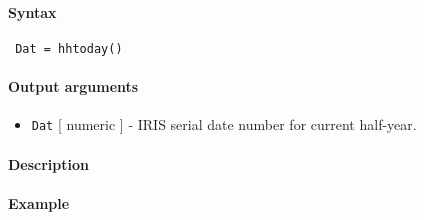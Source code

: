 


	\paragraph{Syntax}
 
 \begin{verbatim}
 Dat = hhtoday()
 \end{verbatim}
 
 \paragraph{Output arguments}
 
 \begin{itemize}
 \item
   \texttt{Dat} {[} numeric {]} - IRIS serial date number for current
   half-year.
 \end{itemize}
 
 \paragraph{Description}
 
 \paragraph{Example}


